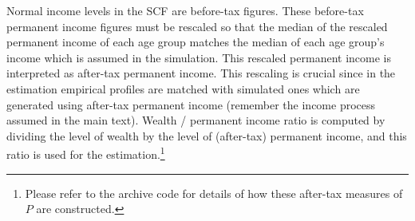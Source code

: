 \documentclass[titlepage, headings=optiontotocandhead]{\econtex}
\begin{document}
Normal income levels in the SCF are before-tax figures. These
before-tax permanent income figures must be rescaled so that the median of
the rescaled permanent income of each age group matches the median of
each age group's income which is assumed in the simulation. This
rescaled permanent income is interpreted as after-tax permanent
income. This rescaling is crucial since in the estimation empirical
profiles are matched with simulated ones which are generated using
after-tax permanent income (remember the income process assumed in the
main text). Wealth / permanent income ratio is computed by dividing
the level of wealth by the level of (after-tax) permanent income, and
this ratio is used for the estimation.\footnote{Please refer to the archive code for details of
  how these after-tax measures of $P$ are constructed.}

\vfill\clearpage


\end{document}
